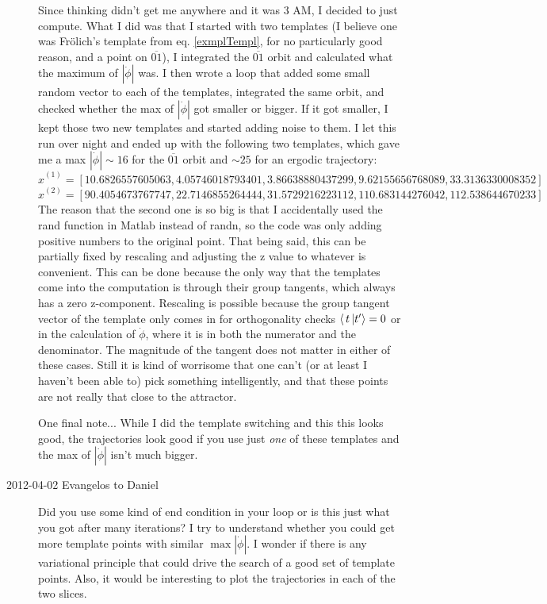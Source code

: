 \begin{description}
Since thinking didn't get me anywhere and it was 3 AM, I decided to just compute. What I did was that I started with two templates (I believe one was Fr\"olich's template from eq. \ref{exmplTempl}, for no particularly good reason, and a point on $\overline{01}$), I integrated the $\overline{01}$ orbit and calculated what the maximum of $|\dot{\phi}|$ was. I then wrote a loop that added some small random vector to each of the templates, integrated the same orbit, and checked whether the max of $|\dot{\phi}|$ got smaller or bigger. If it got smaller, I kept those two new templates and started adding noise to them. I let this run over night and ended up with the following two templates, which gave me a max $|\dot{\phi}| \sim 16$ for the $\overline{01}$ orbit and $\sim 25$ for an ergodic trajectory: \\


$\hat{x}^{(1)} = [10.6826557605063, 4.05746018793401, 3.86638880437299, 9.62155656768089, 33.3136330008352]$ \\ 

$\hat{x}^{(2)} = [90.4054673767747, 22.7146855264444, 31.5729216223112, 110.683144276042, 112.538644670233]$\\

The reason that the second one is so big is that I accidentally used the rand function in Matlab instead of randn, so the code was only adding positive numbers to the original point. That being said, this can be partially fixed by rescaling and adjusting the z value to whatever is convenient. This can be done because the only way that the templates come into the computation is through their group tangents, which always has a zero z-component. Rescaling is possible because the group tangent vector of the template only comes in for orthogonality checks $\braket{\,t\,}{\sliceTan{}{}} = 0$ or in the calculation of $\dot{\phi}$, where it is in both the numerator and the denominator. The magnitude of the tangent does not matter in either of these cases. Still it is kind of worrisome that one can't (or at least I haven't been able to) pick something intelligently, and that these points are not really that close to the attractor.

One final note... While I did the template switching and this this looks good, the trajectories look good if you use just \emph{one} of these templates and the max of $|\dot{\phi}|$ isn't much bigger.

\item[2012-04-02 Evangelos to Daniel] Did you use some kind of end condition in
your loop or is this just what you got after many iterations? I try to understand
whether you could get more template points with similar $\max |\dot{\phi}|$.
I wonder if there is any variational principle that could drive the search of
a good set of template points.
Also, it would be interesting to plot the trajectories in each of the two slices.


\end{description}
